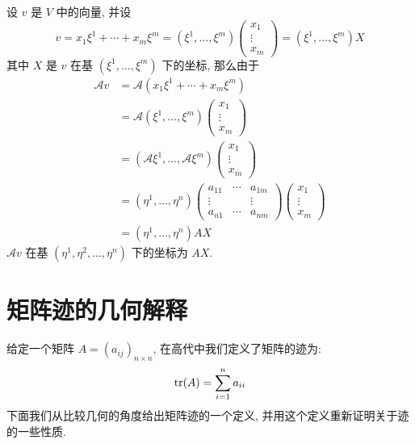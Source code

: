     设 $v$ 是 $V$ 中的向量, 并设
    \begin{equation*}
        v=x_1\xi^1+\cdots+x_m\xi^m=(\xi^1,\dots,\xi^m)
        \begin{pmatrix}
            x_1 \\
            \vdots \\
            x_m
        \end{pmatrix}=(\xi^1,\dots,\xi^m)X
    \end{equation*}
    其中 $X$ 是 $v$ 在基 $(\xi^1,\dots,\xi^m)$ 下的坐标, 那么由于
    \begin{align*}
        \mathcal{A}v &=\mathcal{A}(x_1\xi^1+\cdots+x_m\xi^m) \\
        &=\mathcal{A}(\xi^1,\dots,\xi^m)
        \begin{pmatrix}
            x_1 \\
            \vdots \\
            x_m
        \end{pmatrix} \\
        &=(\mathcal{A}\xi^1,\dots,\mathcal{A}\xi^m)
        \begin{pmatrix}
            x_1 \\
            \vdots \\
            x_m
        \end{pmatrix} \\
        & = (\eta^1,\dots,\eta^n)
        \begin{pmatrix}
            a_{11} & \cdots & a_{1m} \\
            \vdots &        & \vdots \\
            a_{n1} & \cdots & a_{nm}
        \end{pmatrix}
        \begin{pmatrix}
            x_1 \\
            \vdots \\
            x_m
        \end{pmatrix} \\
        & = (\eta^1,\dots,\eta^n)AX
    \end{align*}
    $\mathcal{A}v$ 在基 $(\eta^1,\eta^2,\dots,\eta^n)$ 下的坐标为 $AX$.

\section{矩阵迹的几何解释}
    给定一个矩阵 $A = (a_{ij})_{n\times n}$, 在高代中我们定义了矩阵的迹为:
    \begin{equation*}
        {\rm tr}(A) = \sum_{i = 1}^{n}a_{ii}
    \end{equation*}
    下面我们从比较几何的角度给出矩阵迹的一个定义, 并用这个定义重新证明关于迹的一些性质.

